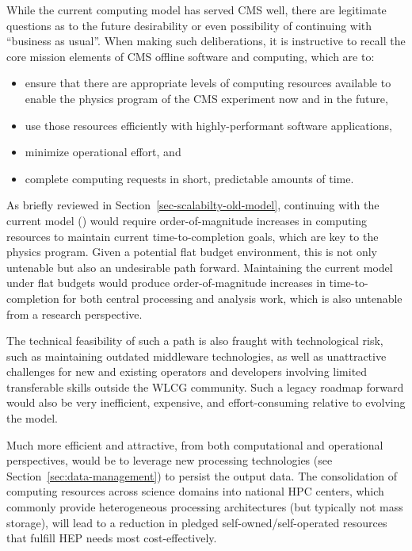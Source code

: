 While the current computing model has served CMS well, there are legitimate questions as to the future desirability or even possibility of continuing with ``business as usual''. When making such deliberations, it is instructive to recall the core mission elements of CMS offline software and computing, which are to:
\begin{itemize}
    \item ensure that there are appropriate levels of computing resources available to enable the physics program of the CMS experiment now and in the future,
    \item use those resources efficiently with highly-performant software applications,
    \item minimize operational effort, and 
    \item complete computing requests in short, predictable amounts of time.
\end{itemize}

As briefly reviewed in Section~\ref{sec-scalabilty-old-model}, continuing with the current model (\RunThree) would require order-of-magnitude increases in computing resources to maintain current time-to-completion goals, which are key to the physics program. Given a potential flat budget environment, this is not only untenable but also an undesirable path forward. Maintaining the current model under flat budgets would produce order-of-magnitude increases in time-to-completion for both central processing and analysis work, which is also untenable from a research perspective.

The technical feasibility of such a path is also fraught with technological risk, such as maintaining outdated middleware technologies, as well as unattractive challenges for new and existing operators and developers involving limited transferable skills outside the \gls{WLCG} community. Such a legacy roadmap forward would also be very inefficient, expensive, and effort-consuming relative to evolving the model. 

Much more efficient and attractive, from both computational and operational perspectives, would be to leverage new processing technologies (see Section~\ref{sec:data-management}) to persist the output data. The consolidation of computing resources across science domains into national \gls{HPC} centers, which commonly provide heterogeneous processing architectures (but typically not mass storage), will lead to a reduction in pledged self-owned/self-operated resources that fulfill \gls{HEP} needs most cost-effectively.


